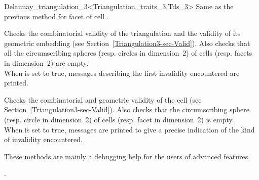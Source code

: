 \begin{ccRefClass}{Delaunay_triangulation_3<Triangulation_traits_3,Tds_3>}
{Same as the previous method for facet  of cell .}

\begin{ccAdvanced}
{Checks the combinatorial validity of the triangulation and the
validity of its geometric embedding (see
Section~\ref{Triangulation3-sec-Valid}). Also checks that all the
circumscribing spheres (resp. circles in dimension~2) of  cells
(resp. facets in dimension~2) are empty.\\ When  is set to
true,  messages describing the first invalidity encountered are
printed.}

{Checks the combinatorial and geometric validity of the cell (see
Section~\ref{Triangulation3-sec-Valid}). Also checks that the
circumscribing sphere (resp. circle in dimension~2) of  cells
(resp. facet in dimension~2) is empty.\\
 When  is set to
true, messages are printed to give
a precise indication of the kind of invalidity encountered.}

These methods are  mainly a debugging help for the users of advanced features.
\end{ccAdvanced}

\ccSeeAlso

.



\end{ccRefClass}


